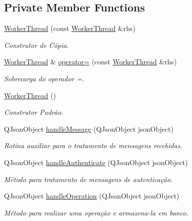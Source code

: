 \subsection*{Private Member Functions}
\begin{DoxyCompactItemize}
\item 
\hyperlink{classWorkerThread_a1e71938585e7ae4e280817622352b209}{Worker\+Thread} (const \hyperlink{classWorkerThread}{Worker\+Thread} \&rhs)
\begin{DoxyCompactList}\small\item\em Construtor de Cópia. \end{DoxyCompactList}\item 
\hyperlink{classWorkerThread}{Worker\+Thread} \& \hyperlink{classWorkerThread_a2650163fc1ed2eb11f19ac07754f327e}{operator=} (const \hyperlink{classWorkerThread}{Worker\+Thread} \&rhs)
\begin{DoxyCompactList}\small\item\em Sobrecarga do operador =. \end{DoxyCompactList}\item 
\hyperlink{classWorkerThread_a4a04907e80bd0776e15fbdb515cd35b3}{Worker\+Thread} ()
\begin{DoxyCompactList}\small\item\em Construtor Padrão. \end{DoxyCompactList}\item 
Q\+Json\+Object \hyperlink{classWorkerThread_ace7c1f1f36697deb8e68f0c8615be93c}{handle\+Message} (Q\+Json\+Object json\+Object)
\begin{DoxyCompactList}\small\item\em Rotina auxiliar para o tratamento de mensagens recebidas. \end{DoxyCompactList}\item 
Q\+Json\+Object \hyperlink{classWorkerThread_a105b46fa3f787f6a2111f2891d8a8d39}{handle\+Authenticate} (Q\+Json\+Object json\+Object)
\begin{DoxyCompactList}\small\item\em Método para tratamento de mensagens de autenticação. \end{DoxyCompactList}\item 
Q\+Json\+Object \hyperlink{classWorkerThread_a7a79b214b331c4f3d2d99e5d312bc5c8}{handle\+Operation} (Q\+Json\+Object json\+Object)
\begin{DoxyCompactList}\small\item\em Método para realizar uma operação e armazena-\/la em banco. \end{DoxyCompactList}\item 

\end{DoxyCompactItemize}
